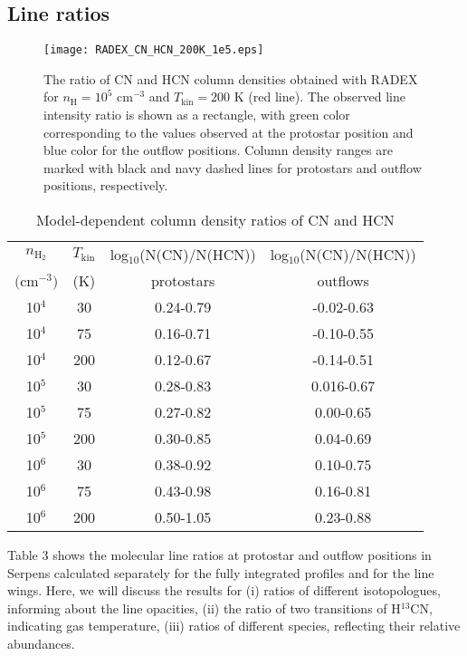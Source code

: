 \documentclass{aa}
\begin{document}
\subsection{Line ratios}
\begin{figure} 
\centering 
\texttt{[image: RADEX\_CN\_HCN\_200K\_1e5.eps]}
\caption{The ratio of CN and HCN column densities obtained with RADEX for $n_\mathrm{H} = 10^5$ cm$^{-3}$ and
$T_\mathrm{kin} = 200$ K (red line). The observed line intensity ratio is
shown as a rectangle, with green color corresponding to the values observed at the 
protostar position and blue color for the outflow positions. Column density ranges are marked with black and navy dashed lines for protostars and outflow positions, respectively.} 
\label{model} 
\end{figure}
\begin{table} \caption{Model-dependent column density ratios of CN and HCN}     
 \centering 
  \label{RADEX_Ns}                       
  \begin{tabular}{c c c c} 
  \hline\hline $n_\mathrm{H_2}$ & $T_\mathrm{kin}$ &
log$_{10}$(N(CN)/N(HCN)) &
log$_{10}$(N(CN)/N(HCN)) \\ 
$($cm$^{-3})$ & (K) & protostars & outflows \\ 
\hline 10$^{4}$ & 30 & 0.24-0.79 & -0.02-0.63  \\
 10$^{4}$ & 75 & 0.16-0.71 & -0.10-0.55 \\
  10$^{4}$ & 200 & 0.12-0.67 & -0.14-0.51 \\ 
  10$^{5}$ & 30 & 0.28-0.83 & 0.016-0.67 \\
   10$^{5}$ & 75 & 0.27-0.82 & 0.00-0.65 \\
    10$^{5}$ & 200 & 0.30-0.85 & 0.04-0.69 \\ 
    10$^{6}$ & 30 & 0.38-0.92 & 0.10-0.75 \\ 
    10$^{6}$ & 75 & 0.43-0.98 & 0.16-0.81 \\ 
    10$^{6}$ & 200 & 0.50-1.05 & 0.23-0.88\\
     \hline 
     \end{tabular} 
     \end{table}
Table 3 shows the molecular line ratios at protostar and outflow positions in Serpens 
calculated separately for the fully integrated profiles and for the line wings. 
Here, we will discuss the results for (i) ratios of different isotopologues, informing 
about the line opacities, (ii) the ratio of two transitions of H$^{13}$CN,
indicating gas temperature, (iii) ratios of different species, reflecting 
their relative abundances.
\end{document}
